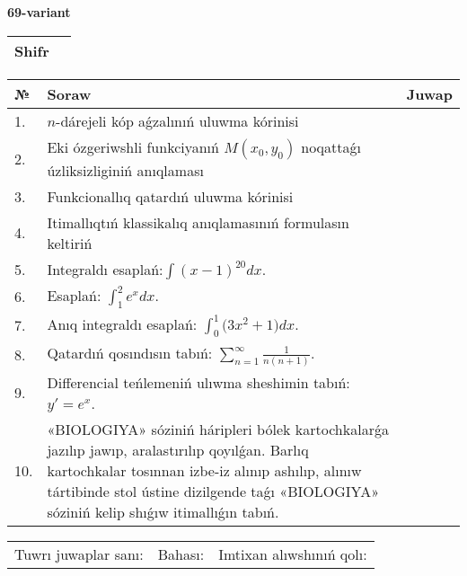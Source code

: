 \documentclass{article}
\begin{document}
  \egroup
  
  \newpage
  
  
  \textbf{69-variant}\\
  
  \bgroup
  \def\arraystretch{1.6} %
  
  \begin{tabular}{|m{5.7cm}|m{9.5cm}|}
  \hline
  Shifr & \\
  \hline
  \end{tabular}
  
  \vspace{1cm}
  
  \begin{tabular}{|m{0.7cm}|m{10cm}|m{4cm}|}
  \hline
  № & Soraw & Juwap \\
  \hline
  1. & \(n\)-dárejeli kóp aǵzalınıń uluwma kórinisi &  \\
  \hline
  2. & Eki ózgeriwshli funkciyanıń \(M(x_{0}, y_{0})\) noqattaǵı úzliksizliginiń anıqlaması &  \\
  \hline
  3. & Funkcionallıq qatardıń uluwma kórinisi &  \\
  \hline
  4. & Itimallıqtıń klassikalıq anıqlamasınıń formulasın keltiriń &  \\
  \hline
  5. & Integraldı esaplań:\(\int{(x - 1)^{20}}dx\). &  \\
  \hline
  6. & Esaplań: \(\int_{1}^2 {e^{x}dx}\). &  \\
  \hline
  7. & Anıq integraldı esaplań: \(\int_{0}^{1}{(3x^2 } + 1)dx\). &  \\
  \hline
  8. & Qatardıń qosındısın tabıń: \(\sum_{n = 1}^{\infty}\frac{1}{n(n + 1)}\). &  \\
  \hline
  9. & Differencial teńlemeniń ulıwma sheshimin tabıń: \(y' = e^{x}\). &  \\
  \hline
  10. & «BIOLOGIYA» sóziniń háripleri bólek kartochkalarǵa jazılıp jawıp, aralastırılıp qoyılǵan. Barlıq kartochkalar tosınnan izbe-iz alınıp ashılıp, alınıw tártibinde stol ústine dizilgende taǵı «BIOLOGIYA» sóziniń kelip shıǵıw itimallıǵın tabıń. &  \\
  \hline
  \end{tabular}
  
  \vspace{1cm}
  
  \begin{tabular}{lll}
  Tuwrı juwaplar sanı: \underline{\hspace{1.5cm}} & 
  Bahası: \underline{\hspace{1.5cm}} & 
  Imtixan alıwshınıń qolı: \underline{\hspace{2cm}} \\
  \end{tabular}
  
\end{document}
